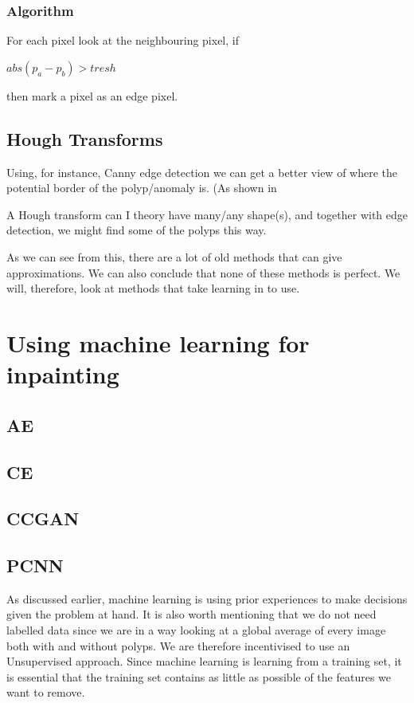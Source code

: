         \subsubsection{Algorithm}
          For each pixel look at the neighbouring pixel, if \\
          
          \begin{centering} 
        $ abs(p_a - p_b)>tresh $\\ 
          \end{centering}
          
          then mark a pixel as an edge pixel. \\
          
      \subsection{Hough Transforms}
        Using, for instance, Canny edge detection %
        we can get a better view of where the potential border of the polyp/anomaly is. (As shown in %
        
        A Hough transform can I theory have many/any shape(s), and together with edge detection, we might find some of the polyps this way.
        
    
    
    
    
    
    
    As we can see from this, there are a lot of old methods that can give approximations. We can also conclude that none of these methods is perfect.
    We will, therefore, look at methods that take learning in to use.
\section{Using machine learning for inpainting}
    \subsection{AE}
    \subsection{CE}
    \subsection{CCGAN}
    \subsection{PCNN}
    As discussed earlier, machine learning is using prior experiences to make decisions given the problem at hand. 
    It is also worth mentioning that we do not need labelled data since we are in a way looking at a global average of every image both with and without polyps. We are therefore incentivised to use an 
    Unsupervised approach.
    Since machine learning is learning from a training set, it is essential that the training set contains as little as possible of the features we want to remove. \\
    
